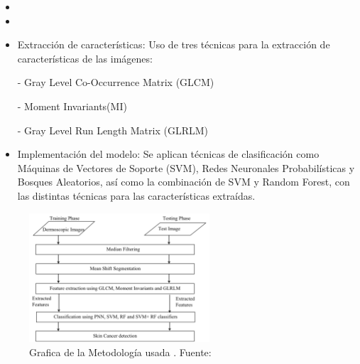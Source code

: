 \newcommand{\MEDSthree}{ Extracción de características: Uso de tres técnicas para la extracción de características de las imágenes: 
	
- Gray Level Co-Occurrence Matrix (GLCM)

- Moment Invariants(MI)

- Gray Level Run Length Matrix (GLRLM)

}
\newcommand{\MEDSfour}{Implementación del modelo: 
	Se aplican técnicas de clasificación como Máquinas de Vectores de Soporte (SVM), Redes Neuronales Probabilísticas y Bosques Aleatorios, así como la combinación de SVM y Random Forest, con las distintas técnicas para las características extraídas.
}


\begin{itemize}
	\item \MEDSone
	\item \MEDStwo
	\item \MEDSthree
	\item \MEDSfour
\end{itemize}

\begin{figure}[h]
	\begin{center}
		\includegraphics[width=0.6\textwidth]{2/figuras/Tecnica_Diagnosis_skin_cancer_imagen_02.png}
		\caption{Grafica de la Metodología usada . Fuente: \cite{murugan_2021diagnosis}}
		\label{1:fig 8}
	\end{center}
\end{figure}



